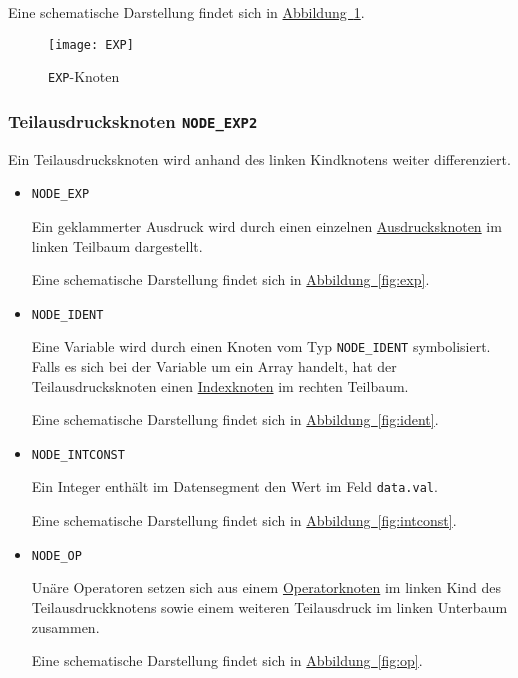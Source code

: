 Eine schematische Darstellung findet sich in \hyperref[fig:expnode]{Abbildung~\ref{fig:expnode}}.

\begin{figure}[h!]
\label{fig:expnode}
\centering
\texttt{[image: EXP]}
\caption{\texttt{EXP}-Knoten}
\end{figure}

\subsubsection{Teilausdrucksknoten \texttt{NODE\_EXP2}}
\label{sec:exp2node}
Ein Teilausdrucksknoten wird anhand des linken Kindknotens weiter differenziert.

\begin{itemize}
\item \texttt{NODE\_EXP}

Ein geklammerter Ausdruck wird durch einen einzelnen \hyperref[sec:expnode]{Ausdrucksknoten} im linken Teilbaum dargestellt.

Eine schematische Darstellung findet sich in \hyperref[fig:exp]{Abbildung~\ref{fig:exp}}.

\item \texttt{NODE\_IDENT}

Eine Variable wird durch einen Knoten vom Typ \texttt{NODE\_IDENT} symbolisiert.
Falls es sich bei der Variable um ein Array handelt,
hat der Teilausdrucksknoten einen \hyperref[sec:indexnode]{Indexknoten} im rechten Teilbaum.

Eine schematische Darstellung findet sich in \hyperref[fig:ident]{Abbildung~\ref{fig:ident}}.

\item \texttt{NODE\_INTCONST}

Ein Integer enthält im Datensegment den Wert im Feld \texttt{data.val}.

Eine schematische Darstellung findet sich in \hyperref[fig:intconst]{Abbildung~\ref{fig:intconst}}.

\item \texttt{NODE\_OP}

Unäre Operatoren setzen sich aus einem \hyperref[sec:opnode]{Operatorknoten} im linken Kind des Teilausdruckknotens sowie einem weiteren Teilausdruck im linken Unterbaum zusammen.

Eine schematische Darstellung findet sich in \hyperref[fig:op]{Abbildung~\ref{fig:op}}.

\end{itemize}

